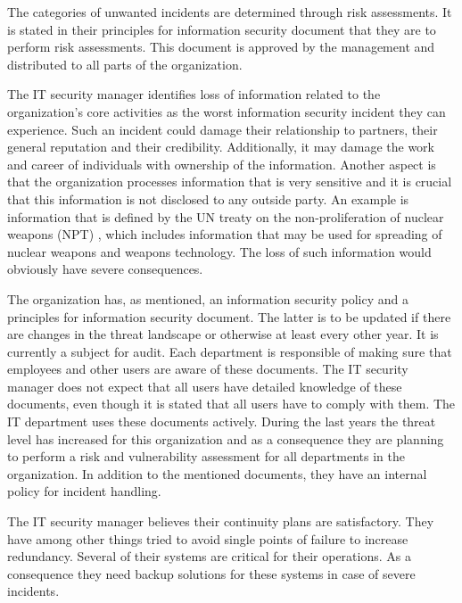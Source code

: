 \documentclass[b5paper, twoside, openright, 11pt]{report}
\begin{document}
The categories of unwanted incidents are determined through risk assessments. It is stated in their principles for information security document that they are to perform risk assessments. This document is approved by the management and distributed to all parts of the organization. %

The IT security manager identifies loss of information related to the organization's core activities as the worst information security incident they can experience. Such an incident could damage their relationship to partners, their general reputation and their credibility. Additionally, it may damage the work and career of individuals with ownership of the information. %
Another aspect is that the organization processes information that is very sensitive and it is crucial that this information is not disclosed to any outside party. An example is information that is defined by the \ac{UN} treaty on the non-proliferation of nuclear weapons (NPT) \cite{NPT}, which includes information that may be used for spreading of nuclear weapons and weapons technology. %
The loss of such information would obviously have severe consequences.

The organization has, as mentioned, an information security policy and a principles for information security document. The latter is to be updated if there are changes in the threat landscape or otherwise at least every other year. It is currently a subject for audit. Each department is responsible of making sure that employees and other users are aware of these documents. The IT security manager does not expect that all users have detailed knowledge of these documents, even though it is stated that all users have to comply with them. The IT department uses these documents actively. %
During the last years the threat level has increased for this organization and as a consequence they are planning to perform a risk and vulnerability assessment for all departments in the organization. In addition to the mentioned documents, they have an internal policy for incident handling.

The IT security manager believes their continuity plans are satisfactory. They have among other things tried to avoid single points of failure to increase redundancy. Several of their systems are critical for their operations. As a consequence they need backup solutions for these systems in case of severe incidents. 
\end{document}
